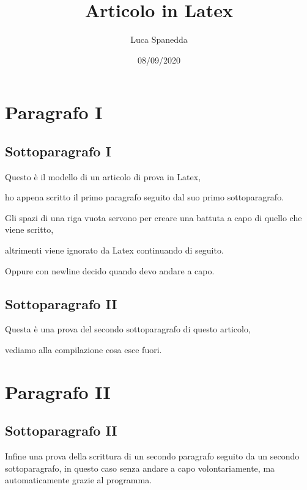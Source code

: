 \documentclass[10pt,a4paper]{article}
\begin{document}
\title{Articolo in Latex}
\author{Luca Spanedda}
\date{08/09/2020}
\maketitle

\section{Paragrafo I}
\subsection{Sottoparagrafo I}
Questo è il modello di un articolo di prova in Latex,

ho appena scritto il primo paragrafo seguito dal suo primo sottoparagrafo.

Gli spazi di una riga vuota servono per creare una 
battuta a capo di quello che viene scritto,

altrimenti viene ignorato da Latex continuando di seguito.

Oppure \newline con newline decido quando devo andare a capo.

\subsection{Sottoparagrafo II}
Questa è una prova del secondo sottoparagrafo di questo articolo,

vediamo alla compilazione cosa esce fuori.

\section{Paragrafo II}
\subsection{Sottoparagrafo II}
Infine una prova della scrittura di un secondo paragrafo seguito
da un secondo sottoparagrafo, in questo caso senza andare a capo volontariamente,
ma automaticamente grazie al programma.
\end{document}
